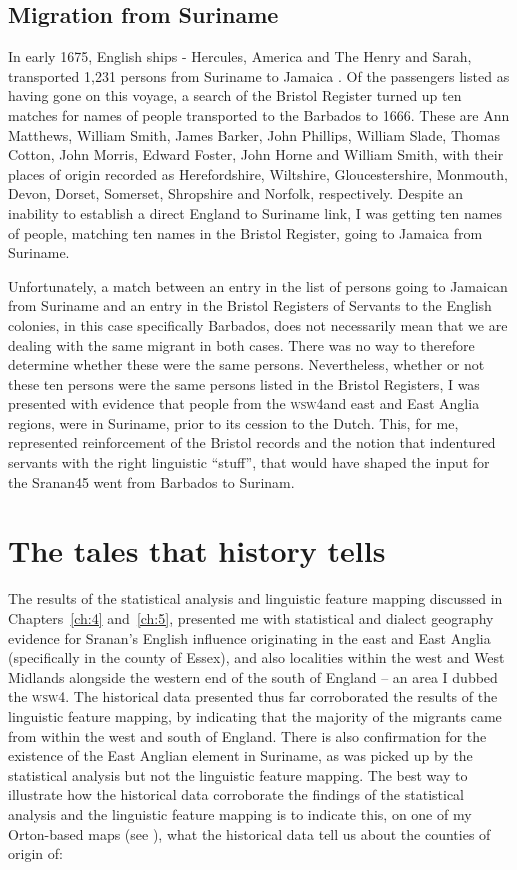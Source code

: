 \subsection{Migration from Suriname}\label{6.2.3}
In early 1675, English ships - Hercules, America and The Henry and Sarah, transported 1,231 persons from Suriname to Jamaica \citep[No. 675 vii; 677i]{Sainsbury93}. Of the passengers listed as having gone on this voyage, a search of the Bristol Register turned up ten matches for names of people transported to the Barbados to 1666. These are Ann Matthews, William Smith, James Barker, John Phillips, William Slade, Thomas Cotton, John Morris, Edward Foster, John Horne and William Smith, with their places of origin recorded as Herefordshire, Wiltshire, Gloucestershire, Monmouth, Devon, Dorset, Somerset, Shropshire and Norfolk, respectively. Despite an inability to establish a direct England to Suriname link, I was getting ten names of people, matching ten names in the Bristol Register, going to Jamaica from Suriname.

Unfortunately, a match between an entry in the list of persons going to Jamaican from Suriname and an entry in the Bristol Registers of Servants to the English colonies, in this case specifically Barbados, does not necessarily mean that we are dealing with the same migrant in both cases. There was no way to therefore determine whether these were the same persons. Nevertheless, whether or not these ten persons were the same persons listed in the Bristol Registers, I was presented with evidence that people from the \textsc{wsw4}and east and East Anglia regions, were in Suriname, prior to its cession to the Dutch. This, for me, represented reinforcement of the Bristol records and the notion that indentured servants with the right linguistic ``stuff'', that would have shaped the input for the Sranan45 went from Barbados to Surinam.

\section{The tales that history tells} \label{6.3}
The results of the statistical analysis and linguistic feature mapping discussed in Chapters~\ref{ch:4} and~\ref{ch:5}, presented me with statistical and dialect geography evidence for Sranan's English influence originating in the east and East Anglia (specifically in the county of Essex), and also localities within the west and West Midlands alongside the western end of the south of England -- an area I dubbed the \textsc{wsw4}. The historical data presented thus far corroborated the results of the linguistic feature mapping, by indicating that the majority of the migrants came from within the west and south of England. There is also confirmation for the existence of the East Anglian element in Suriname, as was picked up by the statistical analysis but not the linguistic feature mapping. The best way to illustrate how the historical data corroborate the findings of the statistical analysis and the linguistic feature mapping is to indicate this, on one of my Orton-based maps (see ), what the historical data tell us about the counties of origin of:

